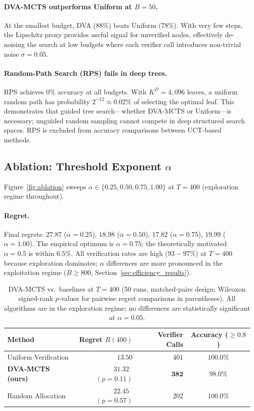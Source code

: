 \paragraph{DVA-MCTS outperforms Uniform at $B{=}50$.}
At the smallest budget, DVA ($88\%$) beats Uniform ($78\%$). With very few steps,
the Lipschitz proxy provides useful signal for unverified nodes, effectively
de-noising the search at low budgets where each verifier call introduces non-trivial
noise $\sigma{=}0.05$.

\paragraph{Random-Path Search (RPS) fails in deep trees.}
RPS achieves $0\%$ accuracy at all budgets. With $K^D{=}4{,}096$ leaves, a uniform
random path has probability $2^{-12}{\approx}0.02\%$ of selecting the optimal leaf.
This demonstrates that guided tree search---whether DVA-MCTS or Uniform---is
necessary; unguided random sampling cannot compete in deep structured search spaces.
RPS is excluded from accuracy comparisons between UCT-based methods.

\subsection{Ablation: Threshold Exponent $\alpha$}
\label{sec:ablation}

Figure~\ref{fig:ablation} sweeps $\alpha \in \{0.25, 0.50, 0.75, 1.00\}$
at $T{=}400$ (exploration regime throughout).

\paragraph{Regret.}
Final regrets: $27.87$ ($\alpha{=}0.25$), $18.98$ ($\alpha{=}0.50$),
$\mathbf{17.82}$ ($\alpha{=}0.75$), $19.99$ ($\alpha{=}1.00$). The empirical
optimum is $\alpha{=}0.75$; the theoretically motivated $\alpha{=}0.5$ is within
$6.5\%$. All verification rates are high ($93{-}97\%$) at $T{=}400$ because
exploration dominates; $\alpha$ differences are more pronounced in the
exploitation regime ($B{\geq}800$, Section~\ref{sec:efficiency_results}).

\begin{table}[t]
\centering
\caption{DVA-MCTS vs.\ baselines at $T{=}400$ (50 runs, matched-pairs design;
  Wilcoxon signed-rank $p$-values for pairwise regret comparisons in parentheses).
  All algorithms are in the exploration regime; no differences are
  statistically significant at $\alpha{=}0.05$.}
\label{tab:summary}
\begin{tabular}{lrrc}
\toprule
Method & Regret $R(400)$ & Verifier Calls & Accuracy (${\geq}0.8$) \\
\midrule
Uniform Verification    & $13.50$ & $401$          & $100.0\%$ \\
\textbf{DVA-MCTS (ours)}& $31.32$~$(p{=}0.11)$ & $\mathbf{382}$ & $98.0\%$ \\
Random Allocation       & $22.45$~$(p{=}0.57)$ & $202$          & $100.0\%$ \\
\bottomrule
\end{tabular}
\end{table}

